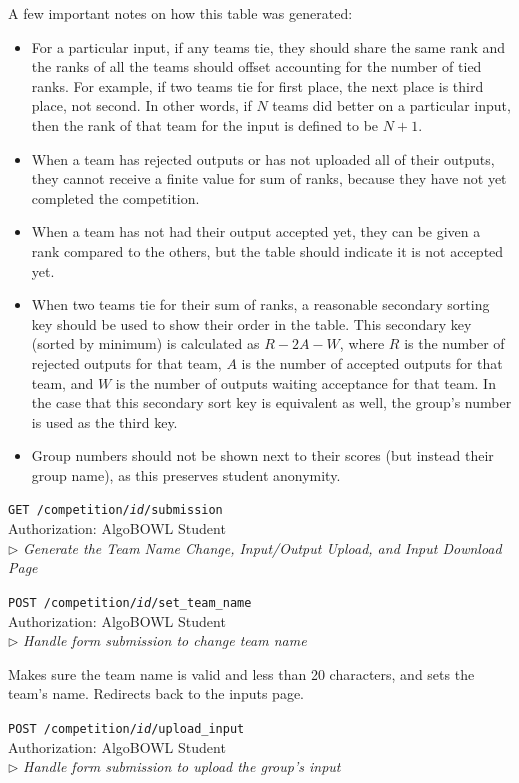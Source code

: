 \documentclass[12pt]{article}
\newcommand\ctrltitle[1]{\par\medskip\texttt{\large #1}\\}
\newcommand\ctrlauth[1]{Authorization: #1\\}
\newcommand\ctrldesc[1]{$\rhd$ \textsl{#1}\par\medskip}
\begin{document}
A few important notes on how this table was generated:

\begin{itemize}
    \item For a particular input, if any teams tie, they should share the same
        rank and the ranks of all the teams should offset accounting for the
        number of tied ranks. For example, if two teams tie for first place,
        the next place is third place, not second. In other words, if $N$ teams
        did better on a particular input, then the rank of that team for the
        input is defined to be $N + 1$.
    \item When a team has rejected outputs or has not uploaded all of their
        outputs, they cannot receive a finite value for sum of ranks, because
        they have not yet completed the competition.
    \item When a team has not had their output accepted yet, they can be given
        a rank compared to the others, but the table should indicate it is not
        accepted yet.
    \item When two teams tie for their sum of ranks, a reasonable secondary
        sorting key should be used to show their order in the table. This
        secondary key (sorted by minimum) is calculated as $R - 2A - W$, where $R$
        is the number of rejected outputs for that team, $A$ is the number of
        accepted outputs for that team, and $W$ is the number of outputs
        waiting acceptance for that team. In the case that this secondary sort
        key is equivalent as well, the group's number is used as the third key.
    \item Group numbers should not be shown next to their scores (but instead
        their group name), as this preserves student anonymity.
\end{itemize}

\ctrltitle{GET /competition/\emph{id}/submission}
\ctrlauth{AlgoBOWL Student}
\ctrldesc{Generate the Team Name Change, Input/Output Upload, and Input Download Page}

\ctrltitle{POST /competition/\emph{id}/set\_team\_name}
\ctrlauth{AlgoBOWL Student}
\ctrldesc{Handle form submission to change team name}

Makes sure the team name is valid and less than 20 characters, and sets the
team's name. Redirects back to the inputs page.

\ctrltitle{POST /competition/\emph{id}/upload\_input}
\ctrlauth{AlgoBOWL Student}
\ctrldesc{Handle form submission to upload the group's input}
\end{document}
